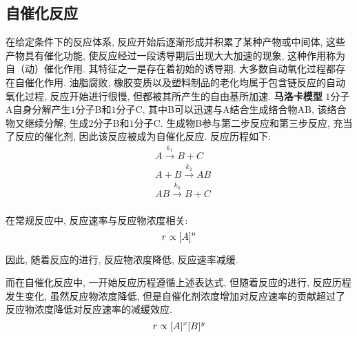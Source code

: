 \documentclass[a4paper]{article}
\begin{document}
\subsection{自催化反应}
在给定条件下的反应体系, 反应开始后逐渐形成并积累了某种产物或中间体, 这些产物具有催化功能, 
使反应经过一段诱导期后出现大大加速的现象, 这种作用称为自（动）催化作用. 其特征之一是存在着初始的诱导期. 
大多数自动氧化过程都存在自催化作用. 油脂腐败, 橡胶变质以及塑料制品的老化均属于包含链反应的自动氧化过程, 
反应开始进行很慢, 但都被其所产生的自由基所加速.
\textbf{马洛卡模型}
$1$分子A自身分解产生$1$分子B和$1$分子C, 其中B可以迅速与A结合生成络合物AB, 该络合物又继续分解, 
生成$2$分子B和$1$分子C. 生成物B参与第二步反应和第三步反应, 充当了反应的催化剂, 
因此该反应被成为自催化反应. 反应历程如下:
\begin{equation}
	\begin{aligned}
		&A \stackrel{k_{1}}{\longrightarrow} B + C\\
		&A + B \stackrel{k_{2}}{\longrightarrow} AB\\
		&AB \stackrel{k_{3}}{\longrightarrow} B + C\\
	\end{aligned}
\end{equation}
\par
在常规反应中, 反应速率与反应物浓度相关:
\begin{equation}
r \propto [A]^{n}\\
\end{equation}
\par
因此, 随着反应的进行, 反应物浓度降低, 反应速率减缓.\par
而在自催化反应中, 一开始反应历程遵循上述表达式, 但随着反应的进行, 
反应历程发生变化, 虽然反应物浓度降低, 
但是自催化剂浓度增加对反应速率的贡献超过了反应物浓度降低对反应速率的减缓效应.\\
\begin{equation}
r \propto [A]^{x}[B]^{y}\\
\end{equation}
\end{document}
